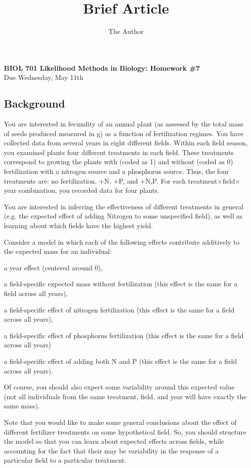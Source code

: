 \documentclass[11pt]{article}
\title{Brief Article}
\author{The Author}
\begin{document}
\begin{center}
	{\bf BIOL 701  Likelihood Methods in Biology: Homework \#7}\\
	{Due Wednesday, May 11th} 
\end{center}
\subsection*{Background}
You are interested in fecundity of an annual plant (as assessed by the total mass of seeds produced measured in g) as a function of fertilization regimes.
You have collected data from several years in eight different fields.  
Within each field season, you examined plants four different treatments in each field.
These treatments correspond to growing the plants with (coded as 1) and without (coded as 0) fertilization with a nitrogen source and a phosphorus source.
Thus, the four treatments are: no fertilization, +N, +P, and +N,P.
For each treatment$\times$field$\times$year combination, you recorded data for four plants.

You are interested in inferring the effectiveness of different treatments in general (e.g. the expected effect of adding Nitrogen to some unspecified field), as well as learning about which fields have the highest yield.

Consider a model in which each of the following effects contribute additively to the expected mass for an individual:
\begin{compactenum}
	\item a year effect (centered around 0),
	\item a field-specific expected mass without fertilization (this effect is the same for a field across all years),
	\item a field-specific effect of nitrogen fertilization (this effect is the same for a field across all years),
	\item a field-specific effect of phosphorus fertilization (this effect is the same for a field across all years)
	\item a field-specific effect of adding both N and P (this effect is the same for a field across all years).
\end{compactenum}
Of course, you should also expect some variability around this expected value (not all individuals from the same treatment, field, and year will have exactly the same mass).

Note that you would like to make some general conclusions about the effect of different fertilizer treatments on some hypothetical field.
So, you should structure the model so that you can learn about expected effects across fields, while accounting for the fact that their may be variability in the response of a particular field to a particular treatment.
\end{document}
